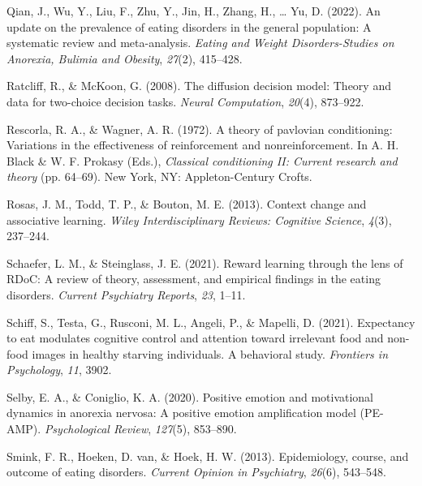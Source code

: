 \documentclass[
  man,floatsintext]{apa6}
\newlength{\cslhangindent}
\newlength{\cslentryspacingunit} %
\newenvironment{CSLReferences}[2] %
 {%
  \setlength{\parindent}{0pt}
  \ifodd #1
  \let\oldpar\par
  \def\par{\hangindent=\cslhangindent\oldpar}
  \fi
  \setlength{\parskip}{#2\cslentryspacingunit}
 }%
 {}
\begin{document}
\begin{CSLReferences}{1}{0}
\leavevmode{}%
Qian, J., Wu, Y., Liu, F., Zhu, Y., Jin, H., Zhang, H., \ldots{} Yu, D. (2022). An update on the prevalence of eating disorders in the general population: A systematic review and meta-analysis. \emph{Eating and Weight Disorders-Studies on Anorexia, Bulimia and Obesity}, \emph{27}(2), 415--428.

\leavevmode{}%
Ratcliff, R., \& McKoon, G. (2008). The diffusion decision model: Theory and data for two-choice decision tasks. \emph{Neural Computation}, \emph{20}(4), 873--922.

\leavevmode{}%
Rescorla, R. A., \& Wagner, A. R. (1972). A theory of pavlovian conditioning: Variations in the effectiveness of reinforcement and nonreinforcement. In A. H. Black \& W. F. Prokasy (Eds.), \emph{Classical conditioning II: Current research and theory} (pp. 64--69). New York, NY: Appleton-Century Crofts.

\leavevmode{}%
Rosas, J. M., Todd, T. P., \& Bouton, M. E. (2013). Context change and associative learning. \emph{Wiley Interdisciplinary Reviews: Cognitive Science}, \emph{4}(3), 237--244.

\leavevmode{}%
Schaefer, L. M., \& Steinglass, J. E. (2021). Reward learning through the lens of RDoC: A review of theory, assessment, and empirical findings in the eating disorders. \emph{Current Psychiatry Reports}, \emph{23}, 1--11.

\leavevmode{}%
Schiff, S., Testa, G., Rusconi, M. L., Angeli, P., \& Mapelli, D. (2021). Expectancy to eat modulates cognitive control and attention toward irrelevant food and non-food images in healthy starving individuals. A behavioral study. \emph{Frontiers in Psychology}, \emph{11}, 3902.

\leavevmode{}%
Selby, E. A., \& Coniglio, K. A. (2020). Positive emotion and motivational dynamics in anorexia nervosa: A positive emotion amplification model (PE-AMP). \emph{Psychological Review}, \emph{127}(5), 853--890.

\leavevmode{}%
Smink, F. R., Hoeken, D. van, \& Hoek, H. W. (2013). Epidemiology, course, and outcome of eating disorders. \emph{Current Opinion in Psychiatry}, \emph{26}(6), 543--548.


\end{CSLReferences}
\end{document}
